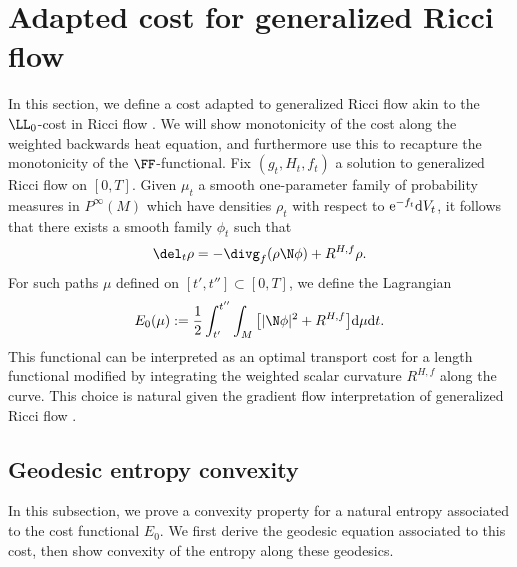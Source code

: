 \section{Adapted cost for generalized Ricci flow}

In this section, we define a cost adapted to generalized Ricci flow akin to the $\LL_0$-cost in Ricci flow \cite{LottOTPRV}. We will show monotonicity of the cost along the weighted backwards heat equation, and furthermore use this to recapture the monotonicity of the $\FF$-functional. Fix $(g_t, H_t, f_t)$ a solution to generalized Ricci flow on $[0,T]$. Given $\mu_t$ a smooth one-parameter family of probability measures in $P^\infty(M)$ which have densities $\rho_t$ with respect to ${\rm e}^{-f_t} {\rm d}V_t$, it follows that there exists a smooth family $\phi_t$ such that
\begin{align} \label{eq: conteq}
 \del_t\rho=-\divg_f(\rho\N\phi)+R^{H,f}\rho.
\end{align}
For such paths $\mu$ defined on $[t',t''] \subset [0,T]$, we define the Lagrangian
\begin{align*}
E_0(\mu):=\frac12\int_{t'}^{t''}\int_M \big[ |\N\phi|^2+R^{H,f} \big] {\rm d}\mu {\rm d}t.
\end{align*}
This functional can be interpreted as an optimal transport cost for a length functional modified by integrating the weighted scalar curvature $R^{H,f}$ along the curve. This choice is natural given the gradient flow interpretation of generalized Ricci flow \cite{OSW}.

\subsection{Geodesic entropy convexity}

In this subsection, we prove a convexity property for a natural entropy associated to the cost functional $E_0$. We first derive the geodesic equation associated to this cost, then show convexity of the entropy along these geodesics.

